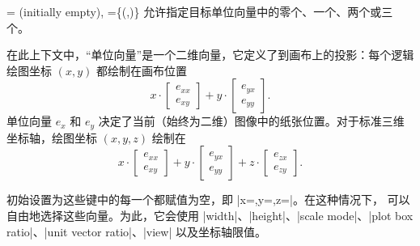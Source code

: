 \begin{pgfplotsxykeylist}{%
    \x= (initially empty),
    \x={\{(,)\}}%
}
        允许指定目标单位向量中的零个、一个、两个或三个。

    在此上下文中，“单位向量”是一个二维向量，它定义了到画布上的投影：每个逻辑绘图坐标 $(x,y)$ 都绘制在画布位置
        \begin{equation*}
            x \cdot
                \begin{bmatrix}
                    e_{xx} \\
                    e_{xy}
                \end{bmatrix}
                    + y \cdot
                        \begin{bmatrix}
                            e_{yx} \\
                            e_{yy}
                        \end{bmatrix}.
        \end{equation*}
    单位向量 $e_x$ 和 $e_y$ 决定了当前（始终为二维）图像中的纸张位置。对于标准三维坐标轴，绘图坐标 $(x,y,z)$ 绘制在
        \begin{equation*}
            x \cdot
                \begin{bmatrix}
                    e_{xx} \\
                    e_{xy}
                \end{bmatrix}
                    + y \cdot
                        \begin{bmatrix}
                            e_{yx} \\
                            e_{yy}
                        \end{bmatrix}
                            + z \cdot
                                \begin{bmatrix}
                                    e_{zx} \\
                                    e_{zy}
                                \end{bmatrix}.
        \end{equation*}

    初始设置为这些键中的每一个都赋值为空，即 |x={},y={},z={}|。在这种情况下，\PGFPlots{} 可以自由地选择这些向量。为此，它会使用 |width|、|height|、|scale mode|、|plot box ratio|、|unit vector ratio|、|view| 以及坐标轴限值。


\end{pgfplotsxykeylist}
